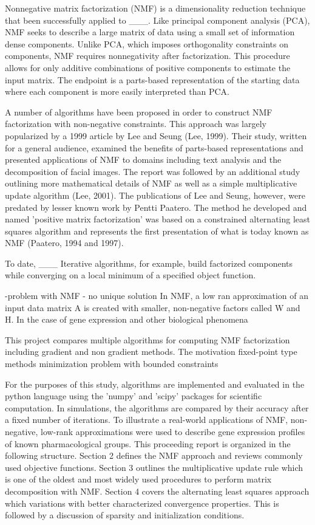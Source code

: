 \documentclass[final,leqno,onefignum,onetabnum]{siamltex1213}
\begin{document}
Nonnegative matrix factorization (NMF) is a dimensionality reduction technique that  been successfully applied to ___. Like principal component analysis (PCA), NMF seeks to describe a large matrix of data using a small set of information dense components. Unlike PCA, which imposes orthogonality constraints on components, NMF requires nonnegativity after factorization. This procedure allows for only additive combinations of positive components to estimate the input matrix. The endpoint is a parts-based representation of the starting data where each component is more easily interpreted than PCA. 

A number of algorithms have been proposed in order to construct NMF factorization with non-negative constraints. This approach was largely popularized by a 1999 article by Lee and Seung (Lee, 1999). Their study, written for a general audience, examined the benefits of parts-based representations and presented applications of NMF to domains including text analysis and the decomposition of facial images. The report was followed by an additional study outlining more mathematical details of NMF as well as a simple multiplicative update algorithm (Lee, 2001). The publications of Lee and Seung, however, were predated by lesser known work by Pentti Paatero. The method he developed and named 'positive matrix factorization' was based on a constrained alternating least squares algorithm and represents the first presentation of what is today known as NMF (Paatero, 1994 and 1997). 

To date, ___
Iterative algorithms, for example, build factorized components while converging on a local minimum of a specified object function. 

-problem with NMF - no unique solution 
In NMF, a low ran approximation of an input data matrix A is created with smaller, non-negative factors called W and H. 
In the case of gene expression and other biological phenomena 

This project compares multiple algorithms for computing NMF factorization including gradient and non gradient methods. The motivation 
fixed-point type methods 
minimization problem with bounded constraints 

For the purposes of this study, algorithms are implemented and evaluated in the python language using the 'numpy' and 'scipy' packages for scientific computation. In simulations, the algorithms are compared by their accuracy after a fixed number of iterations. To illustrate a real-world applications of NMF, non-negative, low-rank approximations were used to describe gene expression profiles of known pharmacological groups. This proceeding report is organized in the following structure. Section 2 defines the NMF approach and reviews commonly used objective functions. Section 3 outlines the multiplicative update rule which is one of the oldest and most widely used procedures to perform matrix decomposition with NMF. Section 4 covers the alternating least squares approach which variations with better characterized convergence properties. This is followed by a discussion of sparsity and initialization conditions. 
\end{document}
